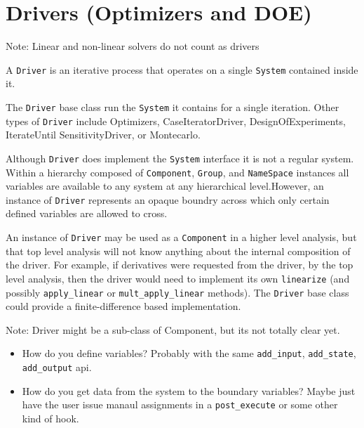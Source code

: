 \documentclass[12pt]{article}
\newcommand{\classname}[1]{\texttt{#1}}
\newcommand{\method}[1]{\texttt{#1}}
\begin{document}
\section{Drivers (Optimizers and DOE)}
Note: Linear and non-linear solvers do not count as drivers

A \classname{Driver} is an iterative process that operates on a single \classname{System} contained inside it.

The \classname{Driver} base class run the \classname{System} it contains for a single iteration.
Other types of \classname{Driver} include Optimizers, CaseIteratorDriver, DesignOfExperiments, IterateUntil
SensitivityDriver, or Montecarlo.

Although \classname{Driver} does implement the \classname{System} interface it is not a regular system.
Within a hierarchy composed of  \classname{Component}, \classname{Group}, and \classname{NameSpace}
instances all variables are available to any system at any hierarchical level.However, an instance
of \classname{Driver} represents an opaque boundry across which only certain defined variables are allowed
to cross.

An instance of \classname{Driver} may be used as a \classname{Component} in a higher level analysis,
but that top level analysis will not know anything about the internal composition of the driver. For example,
if derivatives were requested from the driver, by the top level analysis, then the driver would need to
implement its own \method{linearize} (and possibly \method{apply\_linear} or \method{mult\_apply\_linear} methods).
The \classname{Driver} base class could provide a finite-difference based implementation.

Note: Driver might be a sub-class of Component, but its not totally clear yet.
\begin{itemize}
    \item How do you define variables? Probably with the same \method{add\_input}, \method{add\_state}, \method{add\_output} api.
    \item How do you get data from the system to the boundary variables? Maybe just have the user issue manaul assignments in
    a \method{post\_execute} or some other kind of hook.
\end{itemize}
\end{document}

